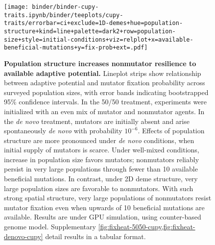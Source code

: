 \begin{figure}[h]
\begin{minipage}{\textwidth}
  \texttt{[image: binder/binder-cupy-traits.ipynb/binder/teeplots/cupy-traits/errorbar=ci+exclude=1D-demes+hue=population-structure+kind=line+palette=dark2+row=population-size+style=initial-conditions+viz=relplot+x=available-beneficial-mutations+y=fix-prob+ext=.pdf]}%
\end{minipage}

\begin{minipage}{\textwidth}
  \caption{%
    \textbf{Population structure increases nonmutator resilience to available adaptive potential.}
    \footnotesize
    Lineplot strips show relationship between adaptive potential and mutator fixation probability across surveyed population sizes, with error bands indicating bootstrapped 95\% confidence intervals.
    In the 50/50 treatment, experiments were initialized with an even mix of mutator and nonmutator agents.
    In the \textit{de novo} treatment, mutators are initially absent and arise spontaneously \textit{de novo} with probability $10^{-6}$.
    Effects of population structure are more pronounced under \textit{de novo} conditions, when initial supply of mutators is scarce.
    Under well-mixed conditions, increase in population size favors mutators; nonmutators reliably persist in very large populations through fewer than 10 available beneficial mutations.
    In contrast, under 2D deme structure, very large population sizes are favorable to nonmutators.
    With such strong spatial structure, very large populations of nonmutators resist mutator fixation even when upwards of 10 beneficial mutations are available.
    Results are under GPU simulation, using counter-based genome model.
    Supplementary \cref{fig:fixheat-5050-cupy,fig:fixheat-denovo-cupy} detail results in a tabular format.
  }
  \label{fig:spatial-structure-combined}
\end{minipage}
\end{figure}
